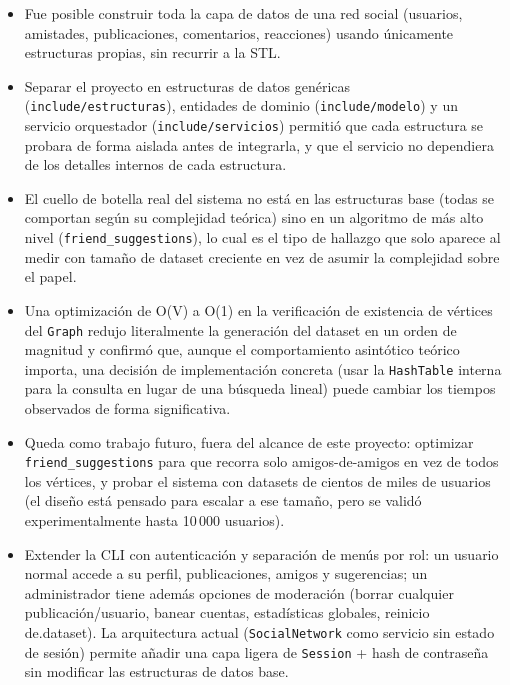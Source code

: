 \documentclass[11pt,a4paper]{article}
\begin{document}
\begin{itemize}[leftmargin=1.4em]
    \item Fue posible construir toda la capa de datos de una red social
    (usuarios, amistades, publicaciones, comentarios, reacciones) usando
    únicamente estructuras propias, sin recurrir a la STL.
    \item Separar el proyecto en estructuras de datos genéricas
    (\texttt{include/estructuras}), entidades de dominio
    (\texttt{include/modelo}) y un servicio orquestador
    (\texttt{include/servicios}) permitió que cada estructura se probara
    de forma aislada antes de integrarla, y que el servicio no dependiera
    de los detalles internos de cada estructura.
    \item El cuello de botella real del sistema no está en las
    estructuras base (todas se comportan según su complejidad teórica)
    sino en un algoritmo de más alto nivel
    (\texttt{friend\_suggestions}), lo cual es el tipo de hallazgo que
    solo aparece al medir con tamaño de dataset creciente en vez de
    asumir la complejidad sobre el papel.
    \item Una optimización de O(V) a O(1) en la verificación de existencia
    de vértices del \texttt{Graph} redujo literalmente la generación del
    dataset en un orden de magnitud y confirmó que, aunque el
    comportamiento asintótico teórico importa, una decisión de
    implementación concreta (usar la \texttt{HashTable} interna para la
    consulta en lugar de una búsqueda lineal) puede cambiar los tiempos
    observados de forma significativa.
    \item Queda como trabajo futuro, fuera del alcance de este proyecto:
    optimizar \texttt{friend\_suggestions} para que recorra solo
    amigos-de-amigos en vez de todos los vértices, y probar el sistema
    con datasets de cientos de miles de usuarios (el diseño está pensado
    para escalar a ese tamaño, pero se validó experimentalmente hasta
    10\,000 usuarios).
    \item Extender la CLI con autenticación y separación de menús por rol:
    un usuario normal accede a su perfil, publicaciones, amigos y
    sugerencias; un administrador tiene además opciones de
    moderación (borrar cualquier publicación/usuario, banear cuentas,
    estadísticas globales, reinicio de.dataset). La arquitectura actual
    (\texttt{SocialNetwork} como servicio sin estado de sesión) permite
    añadir una capa ligera de \texttt{Session} + hash de contraseña sin
    modificar las estructuras de datos base.
\end{itemize}
\end{document}
